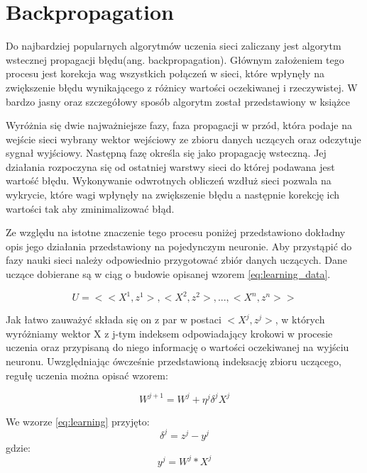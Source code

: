 \section{Backpropagation}

Do najbardziej popularnych algorytmów uczenia sieci zaliczany jest algorytm wstecznej propagacji błędu(ang. backpropagation). Głównym założeniem tego procesu jest korekcja wag wszystkich połączeń w sieci, które wpłynęły na zwiększenie błędu wynikającego z różnicy wartości oczekiwanej i rzeczywistej. W bardzo jasny oraz szczegółowy sposób algorytm został przedstawiony w książce %

Wyróżnia się dwie najważniejsze fazy, faza propagacji w przód, która podaje na wejście sieci wybrany wektor wejściowy ze zbioru danych uczących oraz odczytuje sygnał wyjściowy. Następną fazę określa się jako propagację wsteczną. Jej działania rozpoczyna się od ostatniej warstwy sieci do której podawana jest wartość błędu. Wykonywanie odwrotnych obliczeń wzdłuż sieci pozwala na wykrycie, które wagi wpłynęły na zwiększenie błędu a następnie korekcję ich wartości tak aby zminimalizować błąd.


Ze względu na istotne znaczenie tego procesu poniżej przedstawiono dokładny opis jego działania przedstawiony na pojedynczym neuronie.
Aby przystąpić do fazy nauki sieci należy odpowiednio przygotować zbiór danych uczących. Dane uczące dobierane są w ciąg o budowie opisanej wzorem \ref{eq:learning_data}.

\begin{equation}
U = <<X^{1}, z^{1}>, <X^{2}, z^{2}>,...,<X^{n}, z^{n}>>
\label{eq:learning_data}
\end{equation}

Jak łatwo zauważyć składa się on z par w postaci $<X^{j}, z^{j}>$, w których wyróżniamy wektor X z j-tym indeksem odpowiadający krokowi w procesie uczenia oraz przypisaną do niego informację o wartości oczekiwanej na wyjściu neuronu. Uwzględniając ówcześnie przedstawioną indeksację zbioru uczącego, regułę uczenia można opisać wzorem:

\begin{equation}
W^{j+1} = W^{j} + \eta^{j} \delta^{j} X^{j}
\label{eq:learning}
\end{equation}

We wzorze \ref{eq:learning} przyjęto:
\begin{equation}
\delta^{j} = z^{j} - y^{j}
\label{eq:delta}
\end{equation}
gdzie:
\begin{equation}
y^{j} = W^{j} * X^{j}
\label{eq:output}
\end{equation}

